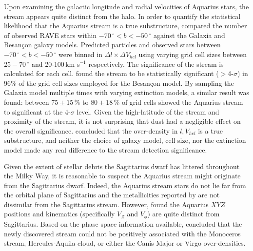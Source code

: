 \documentclass{emulateapj}
\begin{document}
Upon examining the galactic longitude and radial velocities of Aquarius stars, the stream appears quite distinct from the halo. In order to quantify the statistical likelihood that the Aquarius stream is a true substructure, \citet{williams;et-al_2011} compared the number of observed RAVE stars within $-70\,^\circ < b < -50\,^\circ$ against the Galaxia \citep{sharma;et-al_2011} and Besan\c{c}on \citep{robin;et-al_2003} galaxy models. Predicted particles and observed stars between $-70\,^\circ < b < -50\,^\circ$ were binned in $\Delta{l} \times \Delta{V_{hel}}$ using varying grid cell sizes between $25-70\,^\circ$ and 20-100\,km s$^{-1}$ respectively. The significance of the stream is calculated for each cell. \citet{williams;et-al_2011} found the stream to be statistically significant ($>$4-$\sigma$) in 96\% of the grid cell sizes employed for the Besan\c{c}on model. By sampling the Galaxia model multiple times with varying extinction models, a similar result was found: between $75\pm15$\,\% to $80\pm18$\,\% of grid cells showed the Aquarius stream to significant at the 4-$\sigma$ level. Given the high-latitude of the stream and proximity of the stream, it is not surprising that dust had a negligible effect on the overall significance. \citet{williams;et-al_2011} concluded that the over-density in $l, V_{hel}$ is a true substructure, and neither the choice of galaxy model, cell size, nor the extinction model made any real difference to the stream detection significance.




Given the extent of stellar debris the Sagittarius dwarf has littered throughout the Milky Way, it is reasonable to suspect the Aquarius stream might originate from the Sagittarius dwarf. Indeed, the Aquarius stream stars do not lie far from the orbital plane of Sagittarius and the metallicities reported by \citet{williams;et-al_2011} are not dissimilar from the Sagittarius stream. However, \citet{williams;et-al_2011} found the Aquarius $XYZ$ positions and kinematics (specifically $V_{Z}$ and $V_\phi$) are quite distinct from Sagittarius. Based on the phase space information available, \citet{williams;et-al_2011} concluded that the newly discovered stream could not be positively associated with the Monoceros stream, Hercules-Aquila cloud, or either the Canis Major or Virgo over-densities.
\end{document}
